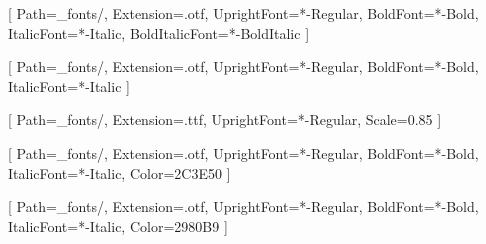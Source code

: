 \usepackage{fontspec}
\usepackage{xcolor}

\setmainfont{LibertinusSerif}[
  Path=_fonts/,
  Extension=.otf,
  UprightFont=*-Regular,
  BoldFont=*-Bold,
  ItalicFont=*-Italic,
  BoldItalicFont=*-BoldItalic
]

\setsansfont{LibertinusSans}[
  Path=_fonts/,
  Extension=.otf,
  UprightFont=*-Regular,
  BoldFont=*-Bold,
  ItalicFont=*-Italic
]

\setmonofont{FiraCode}[
  Path=_fonts/,
  Extension=.ttf,
  UprightFont=*-Regular,
  Scale=0.85
]


\newfontfamily{}[
  Path=_fonts/,
  Extension=.otf,
  UprightFont=*-Regular,
  BoldFont=*-Bold,
  ItalicFont=*-Italic,
  Color=2C3E50
]

\newfontfamily{}[
  Path=_fonts/,
  Extension=.otf,
  UprightFont=*-Regular,
  BoldFont=*-Bold,
  ItalicFont=*-Italic,
  Color=2980B9
]


\newcommand{\filustext}[1]{%
  \begin{quote}
    {\filusfont\textbf{Filus:} #1}
  \end{quote}
}

\newcommand{\aisatext}[1]{%
  \begin{quote}
    {\aisafont\textbf{Aisa:} #1}
  \end{quote}
}

\newenvironment{dialogofilus}{%
  \begin{quote}
  \filusfont
  \noindent\textbf{Filus:}\par
}{%
  \end{quote}
}

\newenvironment{dialogoaisa}{%
  \begin{quote}
  \aisafont
  \noindent\textbf{Aisa:}\par
}{%
  \end{quote}
}




